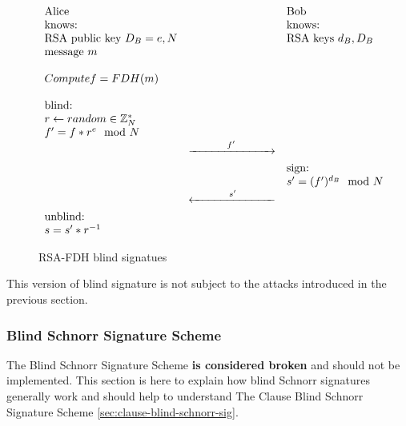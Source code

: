 \begin{figure}[htptp]
    \begin{equation*}
        \begin{array}{ l c l }
            \text{Alice} &  & \text{Bob}
            \\ \text{knows:} & & \text{knows:}
            \\ \text{RSA public key } D_B = e, N & & \text{RSA keys } d_B, D_B
            \\ \text{message } m & &
            \\ & &
            \\ Compute f = FDH(m) & &
            \\ & &
            \\ \text{blind:} & &
            \\ r \leftarrow random \in \mathbb{Z}_N^* & &
            \\ f' = f*r^{e} \mod N & &
            \\ & \xrightarrow[\rule{2.5cm}{0pt}]{f'} &
            \\ & & \text{sign:}
            \\ & & s' = (f')^{d_B} \mod N
            \\ & \xleftarrow[\rule{2.5cm}{0pt}]{s'} &
            \\ \text{unblind:}& &
            \\ s = s'*r^{-1} & &
        \end{array}
    \end{equation*}
    \caption{RSA-FDH blind signatues}
    \label{fig:rsa-fdh-blind-sign}
\end{figure}

This version of blind signature is not subject to the attacks introduced in the previous section.

\subsubsection{Blind Schnorr Signature Scheme}
\label{sec:blind-schnorr-sig}
The Blind Schnorr Signature Scheme \textbf{is considered broken} and should not be implemented.
This section is here to explain how blind Schnorr signatures generally work and should help to understand The Clause Blind Schnorr Signature Scheme \ref{sec:clause-blind-schnorr-sig}.


